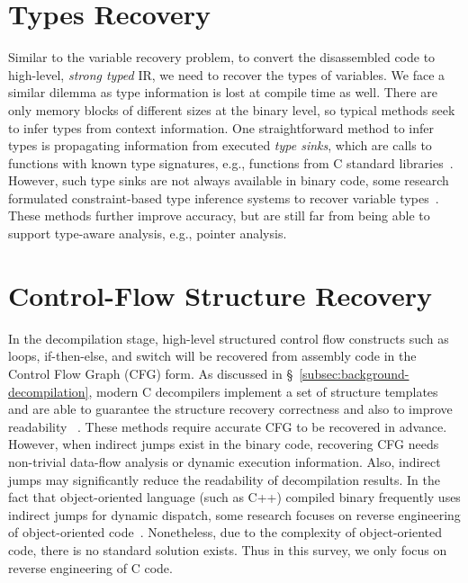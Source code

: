 \section{Types Recovery} \label{sec:challenges-types}
Similar to the variable recovery problem, to convert the disassembled code to
high-level, \textit{strong typed} IR, we need to recover the types of
variables. We face a similar dilemma as type information is lost at compile
time as well. There are only memory blocks of different sizes at the binary
level, so typical methods seek to infer types from context information.
One straightforward method to infer types is propagating information from
executed \textit{type sinks}, which are calls to functions with known type
signatures, e.g., functions from C standard libraries~\cite{lin2010automatic}.
However, such type sinks are not always available in binary code, some
research formulated constraint-based type inference systems to recover
variable types~\cite{lee2011tie,noonan2016polymorphic}. These methods further
improve accuracy, but are still far from being able to support type-aware
analysis, e.g., pointer analysis.

\section{Control-Flow Structure Recovery} \label{sec:challenges-control-flow}
In the decompilation stage, high-level structured control flow constructs such
as loops, if-then-else, and switch will be recovered from assembly code in the
Control Flow Graph (CFG) form. As discussed in
\S~\ref{subsec:background-decompilation}, modern C decompilers implement a
set of structure templates and are able to guarantee the structure recovery
correctness and also to improve readability
~\cite{brumley2013native,yakdan2015no}. These methods require accurate CFG to
be recovered in advance. However, when indirect jumps exist in the binary
code, recovering CFG needs non-trivial data-flow analysis or dynamic execution
information. Also, indirect jumps may significantly reduce the readability of
decompilation results. In the fact that object-oriented language (such as C++)
compiled binary frequently uses indirect jumps for dynamic dispatch, some
research focuses on reverse engineering of object-oriented
code~\cite{katz2016estimating,schwartz2018using,erinfolami2020devil}.
Nonetheless, due to the complexity of object-oriented code, there is no
standard solution exists. Thus in this survey, we only focus on reverse
engineering of C code.


\newpage
